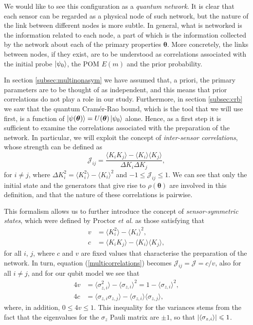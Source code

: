 We would like to see this configuration as a \emph{quantum network}. It is clear that each sensor can be regarded as a physical node of such network, but the nature of the link between different nodes is more subtle. In general, what is networked is the information related to each node, a part of which is the information collected by the network about each of the primary properties $\boldsymbol{\theta}$. More concretely, the links between nodes, if they exist, are to be understood as correlations associated with the initial probe $\ket{\psi_0}$, the POM $E(m)$ and the prior probability. 

In section \ref{subsec:multinonasym} we have assumed that, a priori, the primary parameters are to be thought of as independent, and this means that prior correlations do not play a role in our study. Furthermore, in section \ref{subsec:crb} we saw that the quantum Cram\'{e}r-Rao bound, which is the tool that we will use first, is a function of $\ket{\psi(\boldsymbol{\theta})} = U(\boldsymbol{\theta})\ket{\psi_0}$ alone. Hence, as a first step it is sufficient to examine the correlations associated with the preparation of the network. In particular, we will exploit the concept of \emph{inter-sensor correlations}, whose strength can be defined as \cite{knott2016local, proctor2017networked}
\begin{equation}
\mathcal{J}_{ij} = \frac{\langle K_i K_j \rangle - \langle K_i \rangle\langle K_j \rangle}{\Delta K_i \Delta K_j},
\label{multicorrelations}
\end{equation}
for $i \neq j$, where $\Delta K_i^2 = \langle K_i^2 \rangle - \langle K_i \rangle^2$ and $-1 \leqslant \mathcal{J}_{ij} \leqslant 1$. We can see that only the initial state and the generators that give rise to $\rho(\boldsymbol{\theta})$ are involved in this definition, and that the nature of these correlations is pairwise.

This formalism allows us to further introduce the concept of \emph{sensor-symmetric states}, which were defined by Proctor \emph{et al.} \cite{proctor2017networked} as those satisfying that
\begin{align}
v &= \langle K_i^2 \rangle - \langle K_i \rangle^2,
\nonumber \\
c &=\langle K_i K_j \rangle - \langle K_i \rangle\langle K_j \rangle,
\label{sensorsymcon}
\end{align}
for all $i$, $j$, where $c$ and $v$ are fixed values that characterise the preparation of the network. In turn, equation (\ref{multicorrelations}) becomes $\mathcal{J}_{ij}=\mathcal{J} = c/v$, also for all $i\neq j$, and for our qubit model we see that
\begin{align}
4v &= \langle \sigma_{z, i}^2 \rangle - \langle \sigma_{z, i} \rangle^2 = 1 - \langle \sigma_{z, i} \rangle^2,
\nonumber \\
4c &= \langle \sigma_{z, i} \sigma_{z, j} \rangle - \langle \sigma_{z, i} \rangle\langle \sigma_{z, j} \rangle,
\label{sensorsymconqubit}
\end{align}
where, in addition, $0 \leqslant 4v \leqslant 1$. This inequality for the variances stems from the fact that the eigenvalues for the $\sigma_z$ Pauli matrix are $\pm 1$, so that $\abs{\langle \sigma_{z, i} \rangle} \leqslant 1$.

